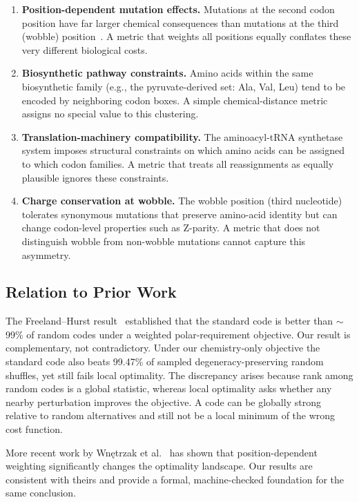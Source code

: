 \documentclass[11pt,twocolumn]{article}
\begin{document}
\begin{enumerate}
\item \textbf{Position-dependent mutation effects.} Mutations at the
  second codon position have far larger chemical consequences than
  mutations at the third (wobble) position~\citep{Woese1966}. A metric
  that weights all positions equally conflates these very different
  biological costs.

\item \textbf{Biosynthetic pathway constraints.} Amino acids within the
  same biosynthetic family (e.g., the pyruvate-derived set: Ala, Val, Leu)
  tend to be encoded by neighboring codon boxes. A simple chemical-distance
  metric assigns no special value to this clustering.

\item \textbf{Translation-machinery compatibility.} The aminoacyl-tRNA
  synthetase system imposes structural constraints on which amino acids can
  be assigned to which codon families. A metric that treats all
  reassignments as equally plausible ignores these constraints.

\item \textbf{Charge conservation at wobble.} The wobble position (third
  nucleotide) tolerates synonymous mutations that preserve amino-acid
  identity but can change codon-level properties such as Z-parity. A
  metric that does not distinguish wobble from non-wobble mutations cannot
  capture this asymmetry.
\end{enumerate}

\subsection{Relation to Prior Work}

The Freeland--Hurst result~\citep{FreelandHurst1998} established that the
standard code is better than $\sim$99\% of random codes under a weighted
polar-requirement objective. Our result is complementary, not contradictory.
Under our chemistry-only objective the standard code also beats 99.47\% of
sampled degeneracy-preserving random shuffles, yet still fails local
optimality. The discrepancy arises because rank among random codes is a
global statistic, whereas local optimality asks whether any nearby
perturbation improves the objective. A code can be globally strong relative
to random alternatives and still not be a local minimum of the wrong cost
function.

More recent work by Wnętrzak et al.~\citep{Wnetrzak2018} has shown that
position-dependent weighting significantly changes the optimality landscape.
Our results are consistent with theirs and provide a formal, machine-checked
foundation for the same conclusion.
\end{document}
